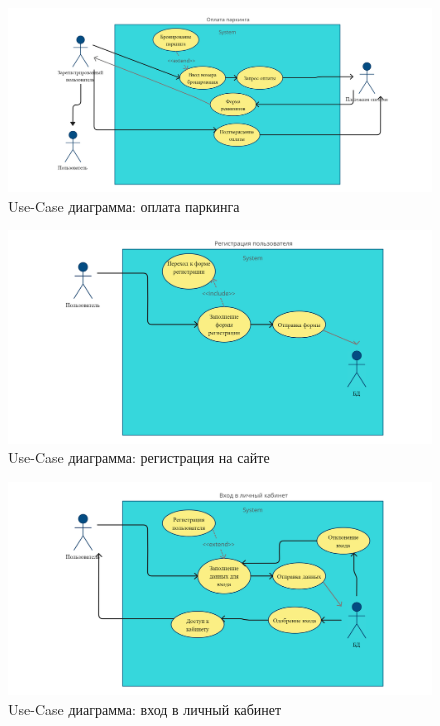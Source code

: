 \begin{figure}
      \includegraphics[width=16cm]{4-actions/Pay_parking.jpg}
      \centering
      \caption{Use-Case диаграмма: оплата паркинга}
\end{figure}

\begin{figure}
      \includegraphics[width=16cm]{4-actions/Registration.jpg}
      \centering
      \caption{Use-Case диаграмма: регистрация на сайте}
\end{figure}

\begin{figure}
      \includegraphics[width=16cm]{4-actions/Enter.jpg}
      \centering
      \caption{Use-Case диаграмма: вход в личный кабинет}
\end{figure}

